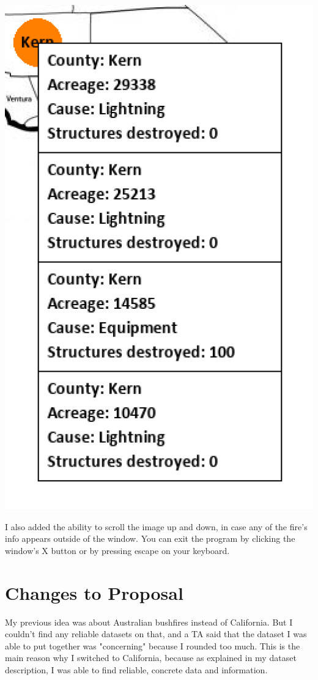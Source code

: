 \documentclass[fontsize=11pt]{article}
\begin{document}
\includegraphics[scale=0.6]{circle_info.PNG}

I also added the ability to scroll the image up and down, in case any of the fire's info appears outside of the window. You can exit the program by clicking the window's X button or by pressing escape on your keyboard.

\section*{Changes to Proposal}
My previous idea was about Australian bushfires instead of California. But I couldn't find any reliable datasets on that, and a TA said that the dataset I was able to put together was "concerning" because I rounded too much. This is the main reason why I switched to California, because as explained in my dataset description, I was able to find reliable, concrete data and information.
\end{document}
